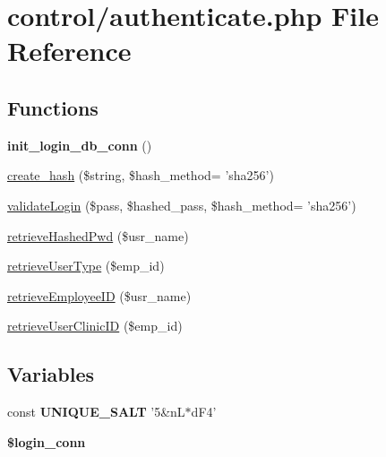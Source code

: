 \hypertarget{authenticate_8php}{\section{control/authenticate.php File Reference}
\label{authenticate_8php}
}
\subsection*{Functions}
\begin{DoxyCompactItemize}
\item 
\hypertarget{authenticate_8php_a290dc9b08db6ef2c2b26400c5b04d750}{{\bfseries init\-\_\-login\-\_\-db\-\_\-conn} ()}\label{authenticate_8php_a290dc9b08db6ef2c2b26400c5b04d750}

\item 
\hyperlink{authenticate_8php_ada393ceabbc91639c41bfb9ffd5e852e}{create\-\_\-hash} (\$string, \$hash\-\_\-method= 'sha256')
\item 
\hyperlink{authenticate_8php_a5654a813bd8d07f822099476c8ebf2aa}{validate\-Login} (\$pass, \$hashed\-\_\-pass, \$hash\-\_\-method= 'sha256')
\item 
\hyperlink{authenticate_8php_a497c371aa0f8c35ba3bcd92befafd960}{retrieve\-Hashed\-Pwd} (\$usr\-\_\-name)
\item 
\hyperlink{authenticate_8php_a9885c0712436d8e44830c054fdc04370}{retrieve\-User\-Type} (\$emp\-\_\-id)
\item 
\hyperlink{authenticate_8php_a40198bd17220f2f39b96138e0b7e5f93}{retrieve\-Employee\-I\-D} (\$usr\-\_\-name)
\item 
\hyperlink{authenticate_8php_a3809efbee136c0e0ec034bcccb98a4a9}{retrieve\-User\-Clinic\-I\-D} (\$emp\-\_\-id)
\end{DoxyCompactItemize}
\subsection*{Variables}
\begin{DoxyCompactItemize}
\item 
\hypertarget{authenticate_8php_a1d006a7b6406a114b344a7e62e438edf}{const {\bfseries U\-N\-I\-Q\-U\-E\-\_\-\-S\-A\-L\-T} '5\&n\-L$\ast$d\-F4'}\label{authenticate_8php_a1d006a7b6406a114b344a7e62e438edf}

\item 
\hypertarget{authenticate_8php_af20afa9ec8b1fdbebf95b48a90e74cab}{{\bfseries \$login\-\_\-conn}}\label{authenticate_8php_af20afa9ec8b1fdbebf95b48a90e74cab}

\end{DoxyCompactItemize}


